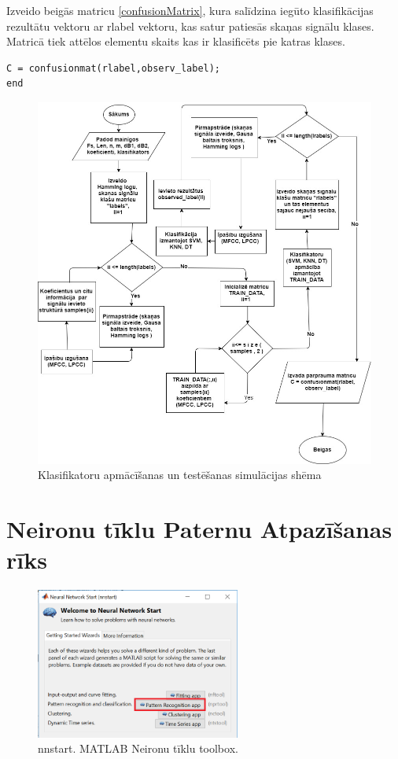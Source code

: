 \documentclass[12pt,paper=A4]{report}
\begin{document}
Izveido beigās matricu \ref{confusionMatrix}, kura salīdzina iegūto klasifikācijas rezultātu vektoru ar rlabel vektoru, kas satur patiesās skaņas signālu klases. Matricā tiek attēlos elementu skaits kas ir klasificēts pie katras klases. 
\begin{lstlisting}
C = confusionmat(rlabel,observ_label);
end
\end{lstlisting}


 \begin{figure}[H] \centering
\includegraphics[width=1.00\textwidth]{download} 
\caption{Klasifikatoru apmācīšanas un testēšanas simulācijas shēma}  \label{blockshema} 
\end{figure}

\section{Neironu tīklu                                                                                                                                                   Paternu Atpazīšanas rīks}

\begin{figure}[H] \centering
\includegraphics[width=0.60\textwidth]{mat} 
\caption{nnstart. MATLAB Neironu tīklu toolbox. \cite{dtw18}}  \label{mattoolbox} 
\end{figure}
\end{document}
